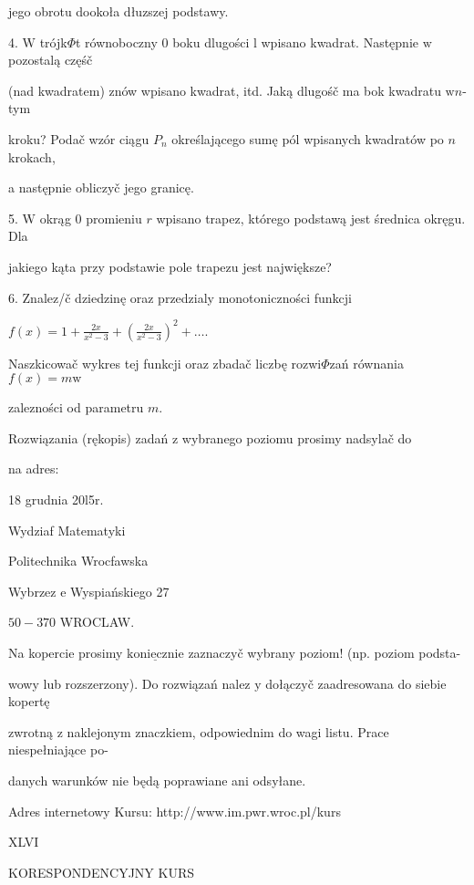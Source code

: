 \documentclass[a4paper,12pt]{article}
\begin{document}
jego obrotu dookoła dłuzszej podstawy.

4. $\mathrm{W}$ trójk$\Phi$t równoboczny $0$ boku dlugości l wpisano kwadrat. Następnie $\mathrm{w}$ pozostalą częśč

(nad kwadratem) znów wpisano kwadrat, itd. Jaką dlugośč ma bok kwadratu $\mathrm{w}n$-tym

kroku? Podač wzór ciągu $P_{n}$ określającego sumę pól wpisanych kwadratów po $n$ krokach,

a następnie obliczyč jego granicę.

5. $\mathrm{W}$ okrąg $0$ promieniu $r$ wpisano trapez, którego podstawą jest średnica okręgu. Dla

jakiego kąta przy podstawie pole trapezu jest największe?

6. Znalez/č dziedzinę oraz przedzialy monotoniczności funkcji

$f(x)=1+\displaystyle \frac{2x}{x^{2}-3}+(\frac{2x}{x^{2}-3})^{2}+\ldots.$

Naszkicowač wykres tej funkcji oraz zbadač liczbę rozwi$\Phi$zań równania $f(x) = m \mathrm{w}$

zalezności od parametru $m.$

Rozwiązania (rękopis) zadań z wybranego poziomu prosimy nadsylač do

na adres:

18 grudnia 20l5r.

Wydziaf Matematyki

Politechnika Wrocfawska

Wybrzez $\mathrm{e}$ Wyspiańskiego 27

$50-370$ WROCLAW.

Na kopercie prosimy $\underline{\mathrm{k}\mathrm{o}\mathrm{n}\mathrm{i}\mathrm{e}\mathrm{c}\mathrm{z}\mathrm{n}\mathrm{i}\mathrm{e}}$ zaznaczyč wybrany poziom! (np. poziom podsta-

wowy lub rozszerzony). Do rozwiązań nalez $\mathrm{y}$ dołączyč zaadresowana do siebie kopertę

zwrotną $\mathrm{z}$ naklejonym znaczkiem, odpowiednim do wagi listu. Prace niespełniające po-

danych warunków nie będą poprawiane ani odsyłane.

Adres internetowy Kursu: http://www.im.pwr.wroc.pl/kurs







XLVI

KORESPONDENCYJNY KURS
\end{document}
